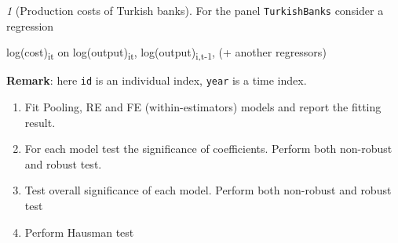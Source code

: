 \documentclass[12pt]{article}
\theoremstyle{remark}
\newtheorem{exercise}{}[section]
\begin{document}
\begin{exercise}[Production costs of Turkish banks]
For the panel \texttt{TurkishBanks} consider a regression
\begin{center}
	log(cost)\textsubscript{it} on log(output)\textsubscript{it},  
	log(output)\textsubscript{i,t-1}, (+ another regressors)  
\end{center}
\textbf{Remark}: here \texttt{id} is an individual index, 
\texttt{year} is a time index.
\begin{enumerate}
	\item Fit Pooling, RE and FE (within-estimators) models
	and report the fitting result.
	\item For each model test the significance of coefficients. Perform both
	non-robust and robust test.
	\item Test overall significance of each model. Perform both
	non-robust and robust test
	\item Perform Hausman test
\end{enumerate}
\end{exercise}
\end{document}

